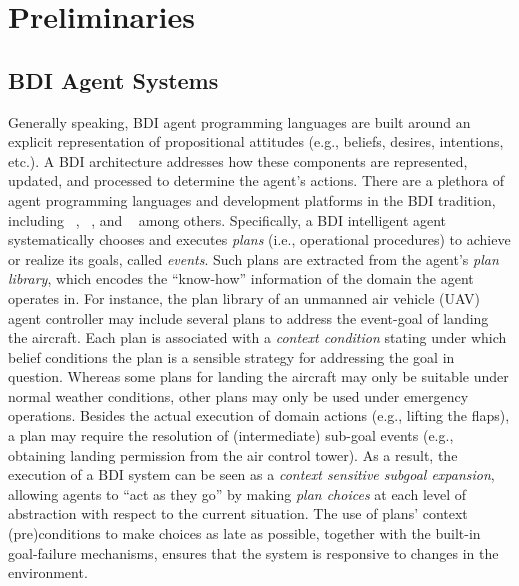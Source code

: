 \section{Preliminaries}\label{sec:preliminaries}

\subsection{BDI Agent Systems}


Generally speaking, BDI agent programming languages are built around an explicit representation of propositional attitudes (e.g., beliefs, desires, intentions, etc.). A BDI architecture addresses how these components are represented, updated, and processed to determine the agent's actions.
There are a plethora of agent programming languages and development platforms in the BDI tradition, including
\JACK~\cite{BusettaRHL:AL99-JACK}, 
\JADEX~\cite{Pokahr:EXP03-JADEX}, and
\JASON~\cite{jasonbook}
among others. 
Specifically, a BDI intelligent agent systematically chooses and executes \emph{plans} (i.e., operational procedures) to achieve or realize its goals, called \emph{events}.
Such plans are extracted from the agent's \emph{plan library}, which encodes the ``know-how'' information of the domain the agent operates in.
For instance, the plan library of an unmanned air vehicle (UAV) agent controller may include several plans to address the event-goal of landing the aircraft. Each plan is associated with a \emph{context condition} stating under which belief conditions the plan is a sensible strategy for addressing the goal in question. Whereas some plans for landing the aircraft may only be suitable under normal weather conditions, other plans may only be used under emergency operations.
Besides the actual execution of domain actions (e.g., lifting the flaps), a plan may require the resolution of (intermediate) sub-goal events (e.g., obtaining landing permission from the air control tower). As a result, the execution of a BDI system can be seen as a \textit{context sensitive subgoal expansion}, allowing agents to ``act as they go'' by making \emph{plan choices} at each level of abstraction with respect to the current situation. The use of plans' context (pre)conditions to make choices as late as possible, together with the built-in goal-failure mechanisms, ensures that the system is responsive to changes in the environment. 

